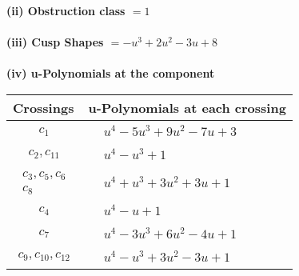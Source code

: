 \documentclass[1p]{elsarticle_modified}
\theoremstyle{definition}
\begin{document}
\flushleft \textbf{(ii) Obstruction class $= 1$}\\~\\
\flushleft \textbf{(iii) Cusp Shapes $= - u^3+2 u^2-3 u+8$}\\~\\
\newpage\renewcommand{\arraystretch}{1}
\flushleft \textbf{(iv) u-Polynomials at the component}\newline \\
\begin{tabular}{m{50pt}|m{274pt}}
Crossings & \hspace{64pt}u-Polynomials at each crossing \\
\hline $$\begin{aligned}c_{1}\end{aligned}$$&$\begin{aligned}
&u^4-5 u^3+9 u^2-7 u+3
\end{aligned}$\\
\hline $$\begin{aligned}c_{2},c_{11}\end{aligned}$$&$\begin{aligned}
&u^4- u^3+1
\end{aligned}$\\
\hline $$\begin{aligned}c_{3},c_{5},c_{6}\\c_{8}\end{aligned}$$&$\begin{aligned}
&u^4+u^3+3 u^2+3 u+1
\end{aligned}$\\
\hline $$\begin{aligned}c_{4}\end{aligned}$$&$\begin{aligned}
&u^4- u+1
\end{aligned}$\\
\hline $$\begin{aligned}c_{7}\end{aligned}$$&$\begin{aligned}
&u^4-3 u^3+6 u^2-4 u+1
\end{aligned}$\\
\hline $$\begin{aligned}c_{9},c_{10},c_{12}\end{aligned}$$&$\begin{aligned}
&u^4- u^3+3 u^2-3 u+1
\end{aligned}$\\
\hline
\end{tabular}\\~\\
\end{document}
